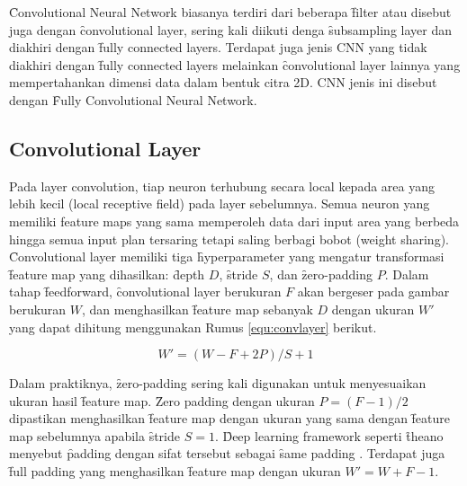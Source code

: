 \f{Convolutional Neural Network} biasanya terdiri dari beberapa \f{filter} atau disebut juga dengan \f{convolutional layer}, sering kali diikuti denga \f{subsampling layer} dan diakhiri dengan \f{fully connected layers}. Terdapat juga jenis CNN yang tidak diakhiri dengan \f{fully connected layers} melainkan \f{convolutional layer} lainnya yang mempertahankan dimensi data dalam bentuk citra 2D. CNN jenis ini disebut dengan \f{Fully Convolutional Neural Network}.

\subsection{Convolutional Layer}
Pada layer convolution, tiap neuron terhubung secara local kepada area yang lebih kecil (local receptive field) pada layer sebelumnya. Semua neuron yang memiliki feature maps yang sama memperoleh data dari input area yang berbeda hingga semua input plan tersaring tetapi saling berbagi bobot (weight sharing).\\
\f{Convolutional layer} memiliki tiga \f{hyperparameter} yang mengatur transformasi \f{feature map} yang dihasilkan: \f{depth} $D$, \f{stride} $S$, dan \f{zero-padding} $P$. Dalam tahap \f{feedforward}, \f{convolutional layer} berukuran $F$ akan bergeser pada gambar berukuran $W$, dan menghasilkan \f{feature map} sebanyak $D$ dengan ukuran $W'$ yang dapat dihitung menggunakan Rumus \ref{equ:convlayer} berikut.

\begin{equation}
\label{equ:convlayer}
W' = (W - F + 2P) / S + 1
\end{equation}

Dalam praktiknya, \f{zero-padding} sering kali digunakan untuk menyesuaikan ukuran hasil \f{feature map}. \f{Zero padding} dengan ukuran $P = (F - 1)/2$ dipastikan menghasilkan \f{feature map} dengan ukuran yang sama dengan \f{feature map} sebelumnya apabila \f{stride} $S = 1$. \f{Deep learning framework} seperti \f{theano} menyebut \f{padding} dengan sifat tersebut sebagai \f{same padding} . Terdapat juga \f{full padding} yang menghasilkan \f{feature map} dengan ukuran $W' = W + F - 1$.

